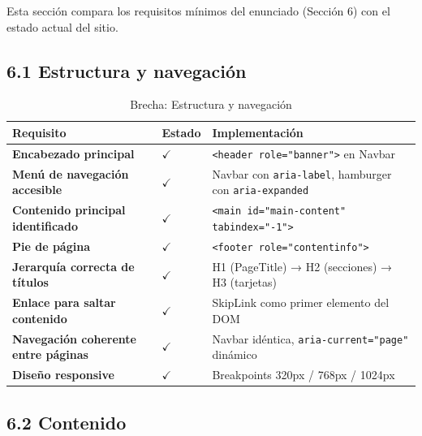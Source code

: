\documentclass[12pt, a4paper]{article}
\newcommand{\cmark}{\textcolor{successgreen}{$\checkmark$}}
\begin{document}
Esta sección compara los requisitos mínimos del enunciado (Sección 6) con el estado actual del sitio.

\subsection{6.1 Estructura y navegación}

\begin{table}[H]
\centering
\caption{Brecha: Estructura y navegación}
\small
\begin{tabular}{@{}>{\bfseries}p{5cm} >{\centering\arraybackslash}p{2cm} p{6.5cm}@{}}
\toprule
\rowcolor{royalblue!12}
\textbf{Requisito} & \textbf{Estado} & \textbf{Implementación} \\
\midrule
Encabezado principal & \cmark & \texttt{<header role="banner">} en Navbar \\
Menú de navegación accesible & \cmark & Navbar con \texttt{aria-label}, hamburger con \texttt{aria-expanded} \\
Contenido principal identificado & \cmark & \texttt{<main id="main-content" tabindex="-1">} \\
Pie de página & \cmark & \texttt{<footer role="contentinfo">} \\
Jerarquía correcta de títulos & \cmark & H1 (PageTitle) → H2 (secciones) → H3 (tarjetas) \\
Enlace para saltar contenido & \cmark & SkipLink como primer elemento del DOM \\
Navegación coherente entre páginas & \cmark & Navbar idéntica, \texttt{aria-current="page"} dinámico \\
Diseño responsive & \cmark & Breakpoints 320px / 768px / 1024px \\
\bottomrule
\end{tabular}
\end{table}

\subsection{6.2 Contenido}
\end{document}
